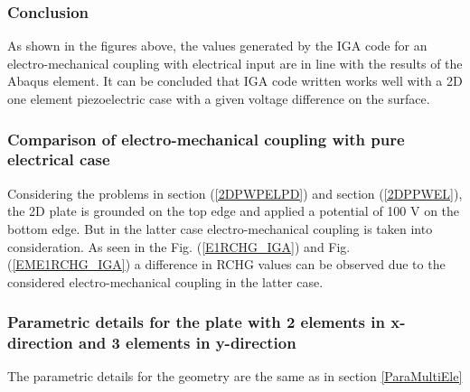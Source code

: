 \documentclass[11pt]{article}
\begin{document}
\subsubsection{Conclusion}
As shown in the figures above, the values generated by the IGA code for an electro-mechanical coupling with electrical input are in line with the results of the Abaqus element. It can be concluded that IGA code written works well with a 2D one element piezoelectric case with a given voltage difference on the surface.

\subsubsection{Comparison of electro-mechanical coupling with pure electrical case}
Considering the problems in section (\ref{2DPWPELPD}) and section (\ref{2DPPWEL}), the 2D plate is grounded on the top edge and applied a potential of 100 V on the bottom edge. But in the latter case electro-mechanical coupling is taken into consideration.
As seen in the Fig. (\ref{E1RCHG_IGA}) and Fig. (\ref{EME1RCHG_IGA}) a difference in RCHG values can be observed due to the considered electro-mechanical coupling in the latter case.

\subsubsection{Parametric details for the plate with 2 elements in x-direction and  3 elements in y-direction}

The parametric details for the geometry are the same as in section \hyperref[ParaMultiEle]{\ref{ParaMultiEle}}
\end{document}

